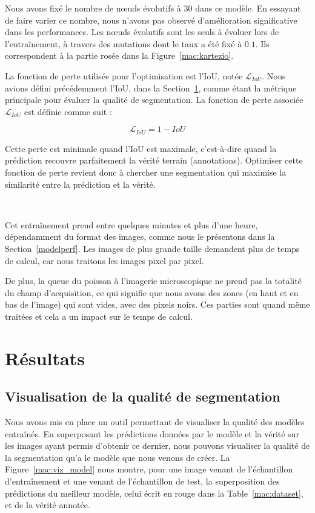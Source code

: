 \documentclass[a4paper,12pt]{report}
\newcommand{\figref}[1]{Figure~\ref{#1}}
\newcommand{\tabref}[1]{Table~\ref{#1}}
\begin{document}
Nous avons fixé le nombre de nœuds évolutifs à 30 dans ce modèle. En essayant de faire varier ce nombre, nous n'avons pas observé d'amélioration significative dans les performances. Les nœuds évolutifs sont les seuls à évoluer lors de l'entraînement, à travers des mutations dont le taux a été fixé à $0.1$. Ils correspondent à la partie rosée dans la \figref{mac:kartezio}.

La fonction de perte utilisée pour l'optimisation est l'IoU, notée $\mathcal{L}_{IoU}$. Nous avions défini précédemment l'IoU, dans la Section~\ref{segimage}, comme étant la métrique principale pour évaluer la qualité de segmentation. La fonction de perte associée $\mathcal{L}_{IoU}$ est définie comme suit :

$$\mathcal{L}_{IoU} = 1 - IoU$$

Cette perte est minimale quand l'IoU est maximale, c'est-à-dire quand la prédiction recouvre parfaitement la vérité terrain (annotations). Optimiser cette fonction de perte revient donc à chercher une segmentation qui maximise la similarité entre la prédiction et la vérité.

\

Cet entraînement prend entre quelques minutes et plus d'une heure, dépendamment du format des images, comme nous le présentons dans la Section~\ref{modelperf}. Les images de plus grande taille demandent plus de temps de calcul, car nous traitons les images pixel par pixel.

De plus, la queue du poisson à l'imagerie microscopique ne prend pas la totalité du champ d'acquisition, ce qui signifie que nous avons des zones (en haut et en bas de l'image) qui sont vides, avec des pixels noirs. Ces parties sont quand même traitées et cela a un impact sur le temps de calcul.

\section{Résultats}\label{segimage}

\subsection{Visualisation de la qualité de segmentation}
Nous avons mis en place un outil permettant de visualiser la qualité des modèles entraînés. En superposant les prédictions données par le modèle et la vérité sur les images ayant permis d'obtenir ce dernier, nous pouvons visualiser la qualité de la segmentation qu'a le modèle que nous venons de créer. La \figref{mac:viz_model} nous montre, pour une image venant de l'échantillon d'entraînement et une venant de l'échantillon de test, la superposition des prédictions du meilleur modèle, celui écrit en rouge dans la \tabref{mac:dataset}, et de la vérité annotée.
\end{document}
